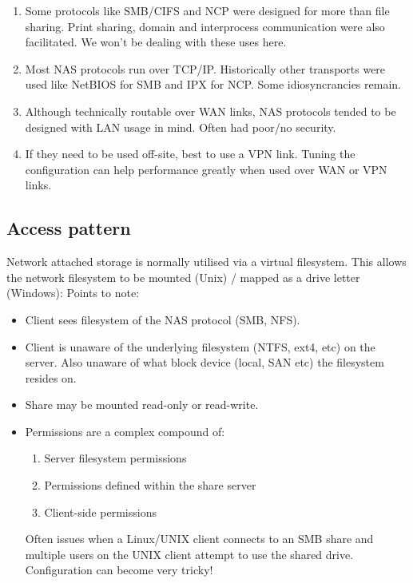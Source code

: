 \documentclass[slides]{pgnotes}
\begin{document}
\begin{enumerate}
\item
  Some protocols like SMB/CIFS and NCP were designed for more than file
  sharing. Print sharing, domain and interprocess communication were
  also facilitated. We won't be dealing with these uses here.
\item
  Most NAS protocols run over TCP/IP. Historically other transports were
  used like NetBIOS for SMB and IPX for NCP. Some idiosyncrancies
  remain.
\item
  Although technically routable over WAN links, NAS protocols tended to
  be designed with LAN usage in mind. Often had poor/no security.
\item
  If they need to be used off-site, best to use a VPN link. Tuning the
  configuration can help performance greatly when used over WAN or VPN
  links.
\end{enumerate}

\subsection{Access pattern}
\label{sec:access-pattern}

Network attached storage is normally utilised via a virtual filesystem.
This allows the network filesystem to be mounted (Unix) / mapped as a
drive letter (Windows): Points to note:

\begin{itemize}
\item
  Client sees filesystem of the NAS protocol (SMB, NFS).
\item
  Client is unaware of the underlying filesystem (NTFS, ext4, etc) on
  the server. Also unaware of what block device (local, SAN etc) the
  filesystem resides on.
\item
  Share may be mounted read-only or read-write.
\item
  Permissions are a complex compound of:

  \begin{enumerate}
  \item
    Server filesystem permissions
  \item
    Permissions defined within the share server
  \item
    Client-side permissions
  \end{enumerate}

  Often issues when a Linux/UNIX client connects to an SMB share and
  multiple users on the UNIX client attempt to use the shared drive.
  Configuration can become very tricky!
\end{itemize}
\end{document}
